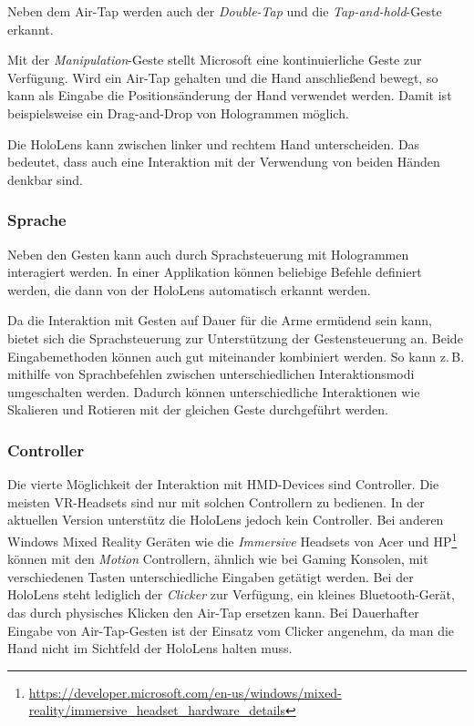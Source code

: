 Neben dem Air-Tap werden auch der \textit{Double-Tap} und die \textit{Tap-and-hold}-Geste erkannt.

Mit der \textit{Manipulation}-Geste stellt Microsoft eine kontinuierliche Geste zur Verfügung. Wird ein Air-Tap gehalten und die Hand anschließend bewegt, so kann als Eingabe die Positionsänderung der Hand verwendet werden. Damit ist beispielsweise ein Drag-and-Drop von Hologrammen möglich.

Die HoloLens kann zwischen linker und rechtem Hand unterscheiden. Das bedeutet, dass auch eine Interaktion mit der Verwendung von beiden Händen denkbar sind.

\subsubsection*{Sprache}
Neben den Gesten kann auch durch Sprachsteuerung mit Hologrammen interagiert werden. In einer Applikation können beliebige Befehle definiert werden, die dann von der HoloLens automatisch erkannt werden.

Da die Interaktion mit Gesten auf Dauer für die Arme ermüdend sein kann, bietet sich die Sprachsteuerung zur Unterstützung der Gestensteuerung an. Beide Eingabemethoden können auch gut miteinander kombiniert werden. So kann z.\,B. mithilfe von Sprachbefehlen zwischen unterschiedlichen Interaktionsmodi umgeschalten werden. Dadurch können unterschiedliche Interaktionen wie Skalieren und Rotieren mit der gleichen Geste durchgeführt werden.

\subsubsection*{Controller}
Die vierte Möglichkeit der Interaktion mit HMD-Devices sind Controller. Die meisten VR-Headsets sind nur mit solchen Controllern zu bedienen. In der aktuellen Version unterstütz die HoloLens jedoch kein Controller. Bei anderen Windows Mixed Reality Geräten wie die \textit{Immersive} Headsets von Acer und HP\footnote{\url{https://developer.microsoft.com/en-us/windows/mixed-reality/immersive_headset_hardware_details}} können mit den \textit{Motion} Controllern, ähnlich wie bei Gaming Konsolen, mit verschiedenen Tasten unterschiedliche Eingaben getätigt werden. Bei der HoloLens steht lediglich der \textit{Clicker} zur Verfügung, ein kleines Bluetooth-Gerät, das durch physisches Klicken den Air-Tap ersetzen kann. Bei Dauerhafter Eingabe von Air-Tap-Gesten ist der Einsatz vom Clicker angenehm, da man die Hand nicht im Sichtfeld der HoloLens halten muss.

